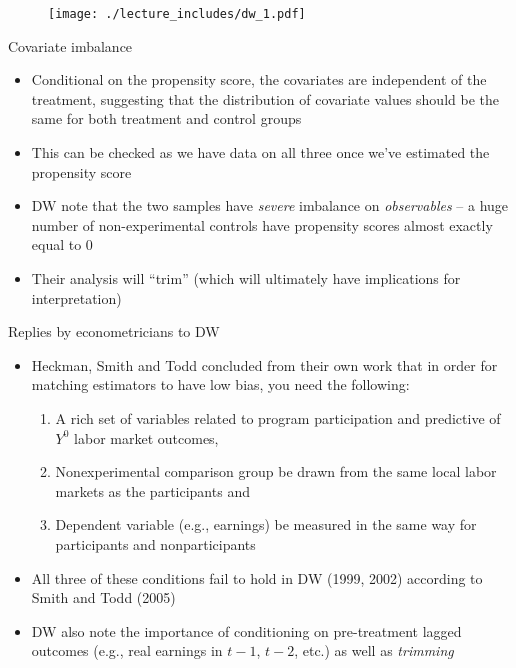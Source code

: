\documentclass{beamer}
\begin{document}
\begin{frame}[plain]
	
\begin{figure}
\texttt{[image: ./lecture\_includes/dw\_1.pdf]}
\end{figure}

\end{frame}


\begin{frame}{Covariate imbalance}
	

	\begin{itemize}
	\item Conditional on the propensity score, the covariates are independent of the treatment, suggesting that the distribution of covariate values should be the same for both treatment and control groups
	\item This can be checked as we have data on all three once we've estimated the propensity score
	\item DW note that the two samples have \emph{severe} imbalance on \emph{observables} -- a huge number of non-experimental controls have propensity scores almost exactly equal to 0
	\item Their analysis will ``trim'' (which will ultimately have implications for interpretation)
	\end{itemize}

\end{frame}






\clearpage
\newpage

\begin{frame}{Replies by econometricians to DW}

\begin{itemize}
\item Heckman, Smith and Todd concluded from their own work that in order for matching estimators to have low bias, you need the following:
	\begin{enumerate}
	\item A rich set of variables related to program participation and predictive of $Y^0$ labor market outcomes, 
	\item Nonexperimental comparison group be drawn from the same local labor markets as the participants and 
	\item Dependent variable (e.g., earnings) be measured in the same way for participants and nonparticipants
	\end{enumerate}
\item All three of these conditions fail to hold in DW (1999, 2002) according to Smith and Todd (2005)
\item DW also note the importance of conditioning on pre-treatment lagged outcomes (e.g., real earnings in $t-1$, $t-2$, etc.) as well as \emph{trimming}
\end{itemize}

\end{frame}
\end{document}
